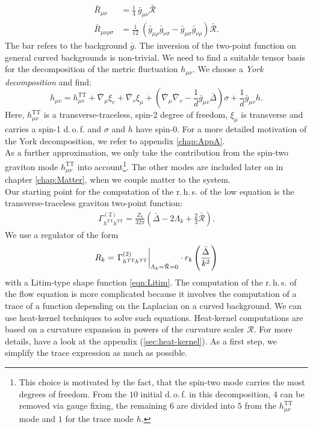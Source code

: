 \begin{equation}
\begin{aligned}
	\bar{R}_{\mu\nu} &= \frac{1}{4} \ \bar{g}_{\mu\nu} \bar{\mathcal{R}}\\[10pt]
	\bar{R}_{\mu\nu\rho\sigma} &= \frac{1}{12} \ (\bar{g}_{\mu\rho}\bar{g}_{\nu\sigma} - \bar{g}_{\mu\sigma}\bar{g}_{\nu\rho}) \bar{\mathcal{R}}.
\end{aligned}	
\end{equation}
The bar refers to the background $\bar{g}$. The inversion of the two-point function on general curved backgrounds is non-trivial. We need to find a suitable tensor basis for the decomposition of the metric fluctuation $h_{\mu\nu}$. We choose a \textit{York decomposition} and find:
\begin{equation}
	h_{\mu v}=h_{\mu v}^{\mathrm{TT}}+\bar{\nabla}_{\mu} \xi_{v}+\bar{\nabla}_{v} \xi_{\mu}+\left(\bar{\nabla}_{\mu} \bar{\nabla}_{v}-\frac{1}{d} \bar{g}_{\mu v} \bar{\Delta}\right) \sigma+\frac{1}{d} \bar{g}_{\mu v} h.
	\label{eqn:York}
\end{equation}
Here, $ h_{\mu\nu}^{\text{TT}}$ is a transverse-traceless, spin-2 degree of freedom, $\xi_{\mu}$ is transverse and carries a spin-1 d.\,o.\,f. and $\sigma$ and $h$ have spin-0. For a more detailed motivation of the York decomposition, we refer to appendix \ref{chap:AppA}.\\
As a further approximation, we only take the contribution from the spin-two graviton mode $h_{\mu\nu}^{\text{TT}}$ into account\footnote{This choice is motivated by the fact, that the spin-two mode carries the most degrees of freedom. From the $10$ initial d.\,o.\,f. in this decomposition, $4$ can be removed via gauge fixing, the remaining $6$ are divided into $5$ from the $h_{\mu\nu}^{\text{TT}}$ mode and $1$ for the trace mode $h$.}. The other modes are included later on in chapter \ref{chap:Matter}, when we couple matter to the system. \\
Our starting point for the computation of the r.\,h.\,s. of the low equation is the transverse-traceless graviton two-point function:
\begin{align}
\Gamma_{h^{\text{TT}}h^{\text{TT}}}^{(2)} = \frac{Z_k}{32\pi}\left(\bar{\Delta} - 2\Lambda_k+\frac{2}{3}\bar{\mathcal{R}}\right).
\end{align}
We use a regulator of the form 
\begin{align}
R_k  = \eval{\Gamma_{h^{\text{TT}}h^{\text{TT}}}^{(2)}}_{\Lambda_k=\bar{\mathcal{R}}=0} \cdot r_k\left(\frac{\bar{\Delta}}{k^2}\right) 
\end{align}
with a Litim-type shape function \ref{eqn:Litim}.
The computation of the r.\,h.\,s. of the flow equation is more complicated because it involves the computation of a trace of a function depending on the Laplacian on a curved background. We can use heat-kernel techniques to solve such equations. Heat-kernel computations are based on a curvature expansion in powers of the curvature scaler $\mathcal{R}$. For more details, have a look at the appendix (\ref{sec:heat-kernel}). As a first step, we simplify the trace expression as much as possible.

